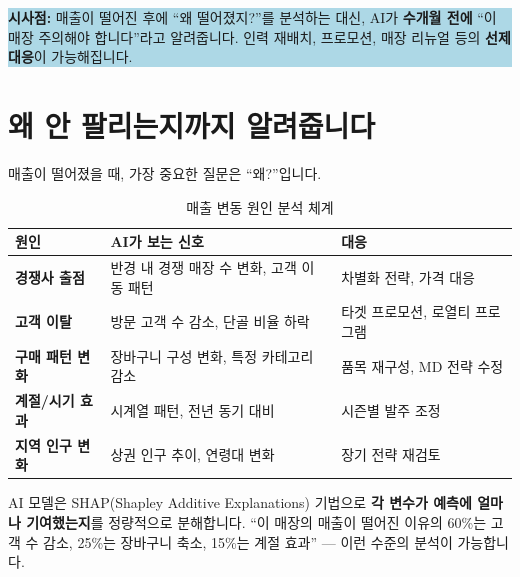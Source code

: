 \documentclass[11pt, a4paper]{article}
\begin{document}
\colorbox{lightblue}{%
\begin{minipage}{0.95\textwidth}\vspace{8pt}
\textbf{시사점:} 매출이 떨어진 후에 ``왜 떨어졌지?''를 분석하는 대신, AI가 \textbf{수개월 전에} ``이 매장 주의해야 합니다''라고 알려줍니다. 인력 재배치, 프로모션, 매장 리뉴얼 등의 \textbf{선제 대응}이 가능해집니다.
\vspace{8pt}
\end{minipage}%
}

\newpage

\section{왜 안 팔리는지까지 알려줍니다}

매출이 떨어졌을 때, 가장 중요한 질문은 ``왜?''입니다.

\begin{table}[H]
\centering
\renewcommand{\arraystretch}{1.4}
\begin{tabularx}{\textwidth}{L{4cm} X L{4cm}}
\toprule
{} \textbf{원인} & \textbf{AI가 보는 신호} & \textbf{대응} \\
\midrule
\textbf{경쟁사 출점} & 반경 내 경쟁 매장 수 변화, 고객 이동 패턴 & 차별화 전략, 가격 대응 \\[6pt]
\textbf{고객 이탈} & 방문 고객 수 감소, 단골 비율 하락 & 타겟 프로모션, 로열티 프로그램 \\[6pt]
\textbf{구매 패턴 변화} & 장바구니 구성 변화, 특정 카테고리 감소 & 품목 재구성, MD 전략 수정 \\[6pt]
\textbf{계절/시기 효과} & 시계열 패턴, 전년 동기 대비 & 시즌별 발주 조정 \\[6pt]
\textbf{지역 인구 변화} & 상권 인구 추이, 연령대 변화 & 장기 전략 재검토 \\
\bottomrule
\end{tabularx}
\caption{매출 변동 원인 분석 체계}
\end{table}

AI 모델은 SHAP(Shapley Additive Explanations) 기법으로 \textbf{각 변수가 예측에 얼마나 기여했는지}를 정량적으로 분해합니다. ``이 매장의 매출이 떨어진 이유의 60\%는 고객 수 감소, 25\%는 장바구니 축소, 15\%는 계절 효과'' — 이런 수준의 분석이 가능합니다.

\newpage

\end{document}
